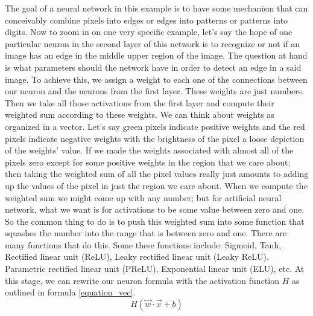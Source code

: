 \documentclass[master]{thesis-uestc}
\begin{document}
The goal of a neural network in this example is to have some mechanism that can conceivably combine pixels into edges or edges into patterns or patterns into digits. Now to zoom in on one very specific example, let's say the hope of one particular neuron in the second layer of this network is to recognize or not if an image has an edge in the middle upper region of the image. The question at hand is what parameters should the network have in order to detect an edge in a said image. To achieve this, we assign a weight to each one of the connections between our neuron and the neurons from the first layer. These weights are just numbers. Then we take all those activations from the first layer and compute their weighted sum according to these weights. We can think about weights as organized in a vector. Let's say green pixels indicate positive weights and the red pixels indicate negative weights with the brightness of the pixel a loose depiction of the weights' value. If we made the weights associated with almost all of the pixels zero except for some positive weights in the region that we care about; then taking the weighted sum of all the pixel values really just amounts to adding up the values of the pixel in just the region we care about. When we compute the weighted sum we might come up with any number; but for artificial neural network, what we want is for activations to be some value between zero and one. So the common thing to do is to push this weighted sum into some function that squashes the number into the range that is between zero and one. There are many functions that do this. Some these functions include: Sigmoid, Tanh, Rectified linear unit (ReLU), Leaky rectified linear unit (Leaky ReLU), Parametric rectified linear unit (PReLU), Exponential linear unit (ELU), etc. At this stage, we can rewrite our neuron formula with the activation function $H$ as outlined in formula \ref{equation_vec}.
\begin{equation}
    H(\vec{w} \cdot \vec{x} + b)
\label{equation_vec}
\end{equation}
\end{document}
